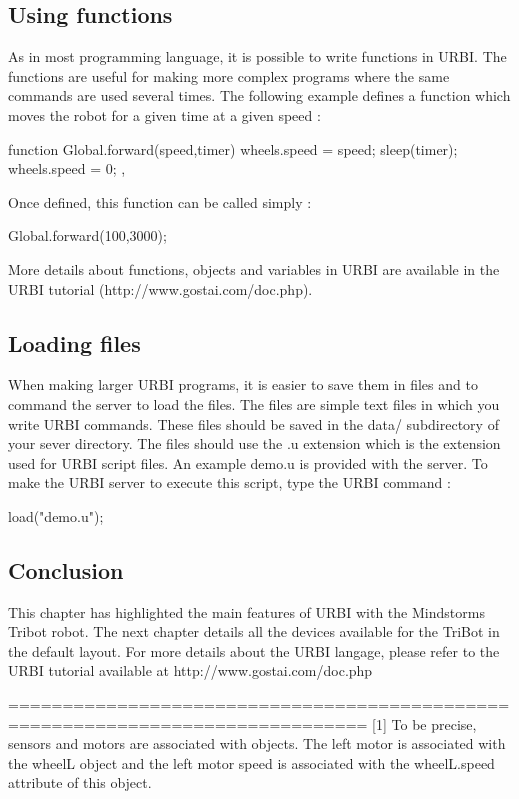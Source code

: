 \subsection{Using functions}
As in most programming language, it is possible to write functions in URBI. The
functions are useful for making more complex programs where the same commands
are used several times.
The following example defines a function which moves the robot for a given time
at a given speed :
\begin{urbiunchecked}
  function Global.forward(speed,timer)
  {
    wheels.speed = speed;
    sleep(timer);
    wheels.speed = 0;
  },
\end{urbiunchecked}


Once defined, this function can be called simply :
\begin{urbiunchecked}
  Global.forward(100,3000);
\end{urbiunchecked}

More details about functions, objects and variables in URBI are available in
the URBI tutorial (http://www.gostai.com/doc.php).

\subsection{Loading files}
When making larger URBI programs, it is easier to save them in files and to
command the server to load the files.
The files are simple text files in which you write URBI commands. These files
should be saved in the data/ subdirectory of your sever directory. The files
should use the .u extension which is the extension used for URBI script files.
An example demo.u is provided with the server. To make the URBI server to
execute this script, type the URBI command :
\begin{urbiunchecked}
  load("demo.u");
\end{urbiunchecked}


\subsection{Conclusion}
This chapter has highlighted the main features of URBI with the Mindstorms
Tribot robot. The next chapter details all the devices available for the TriBot
in the default layout. For more details about the URBI langage, please refer to
the URBI tutorial available at http://www.gostai.com/doc.php

===============================================================================
[1] To be precise, sensors and motors are associated with objects. The left
motor is associated with the wheelL object and the left motor speed is
associated with the wheelL.speed attribute of this object.

